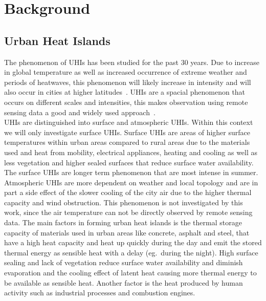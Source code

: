 \section{Background}
\subsection{Urban Heat Islands}
The phenomenon of \glspl{UHI} has been studied for the past 30 years. 
Due to increase in global temperature as well as increased occurrence of extreme weather and periods of heatwaves, this phenomenon will likely increase in intensity and will also occur in cities at higher latitudes~\cite{Sachindra2016}\cite[p.~904]{Wilby2008}.
\glspl{UHI} are a spacial phenomenon that occurs on different scales and intensities, this makes observation using remote sensing data a good and widely used approach~\cite{Weng2003}.\\
\glspl{UHI} are distinguished into surface and atmospheric \glspl{UHI}.
Within this context we will only investigate surface \glspl{UHI}. 
Surface \glspl{UHI} are areas of higher surface temperatures within urban areas compared to rural areas due to the materials used and heat from mobility, electrical appliances, heating and cooling as well as less vegetation and higher sealed surfaces that reduce surface water availability\cite[pp. 7-12]{EPA2008}. 
The surface \glspl{UHI} are longer term phenomenon that are most intense in summer. 
Atmospheric \glspl{UHI} are more dependent on weather and local topology and are in part a side effect of the slower cooling of the city air due to the higher thermal capacity and wind obstruction.
This phenomenon is not investigated by this work, since the air temperature can not be directly observed by remote sensing data.
The main factors in forming urban heat islands is the thermal storage capacity of materials used in urban areas like concrete, asphalt and steel, that have a high heat capacity and heat up quickly during the day and emit the stored thermal energy as sensible heat with a delay (eg.~during the night)\cite{Ramamurthy2014}. 
High surface sealing and lack of vegetation reduce surface water availability and diminish evaporation and the cooling effect of latent heat causing more thermal energy to be available as sensible heat. %
Another factor is the heat produced by human activity such as industrial processes and combustion engines.
